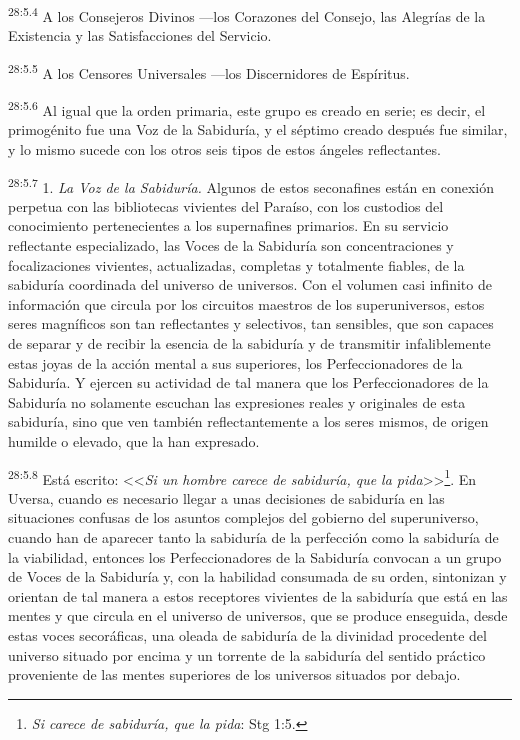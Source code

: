 \par
\textsuperscript{28:5.4} A los Consejeros Divinos ---los Corazones del Consejo, las Alegrías de la Existencia y las Satisfacciones del Servicio.

\par
\textsuperscript{28:5.5} A los Censores Universales ---los Discernidores de Espíritus.

\par
\textsuperscript{28:5.6} Al igual que la orden primaria, este grupo es creado en serie; es decir, el primogénito fue una Voz de la Sabiduría, y el séptimo creado después fue similar, y lo mismo sucede con los otros seis tipos de estos ángeles reflectantes.

\par
\textsuperscript{28:5.7} 1. \textit{La Voz de la Sabiduría.} Algunos de estos seconafines están en conexión perpetua con las bibliotecas vivientes del Paraíso, con los custodios del conocimiento pertenecientes a los supernafines primarios. En su servicio reflectante especializado, las Voces de la Sabiduría son concentraciones y focalizaciones vivientes, actualizadas, completas y totalmente fiables, de la sabiduría coordinada del universo de universos. Con el volumen casi infinito de información que circula por los circuitos maestros de los superuniversos, estos seres magníficos son tan reflectantes y selectivos, tan sensibles, que son capaces de separar y de recibir la esencia de la sabiduría y de transmitir infaliblemente estas joyas de la acción mental a sus superiores, los Perfeccionadores de la Sabiduría. Y ejercen su actividad de tal manera que los Perfeccionadores de la Sabiduría no solamente escuchan las expresiones reales y originales de esta sabiduría, sino que ven también reflectantemente a los seres mismos, de origen humilde o elevado, que la han expresado.

\par
\textsuperscript{28:5.8} Está escrito: <<\textit{Si un hombre carece de sabiduría, que la pida}>>\footnote{\textit{Si carece de sabiduría, que la pida}: Stg 1:5.}. En Uversa, cuando es necesario llegar a unas decisiones de sabiduría en las situaciones confusas de los asuntos complejos del gobierno del superuniverso, cuando han de aparecer tanto la sabiduría de la perfección como la sabiduría de la viabilidad, entonces los Perfeccionadores de la Sabiduría convocan a un grupo de Voces de la Sabiduría y, con la habilidad consumada de su orden, sintonizan y orientan de tal manera a estos receptores vivientes de la sabiduría que está en las mentes y que circula en el universo de universos, que se produce enseguida, desde estas voces secoráficas, una oleada de sabiduría de la divinidad procedente del universo situado por encima y un torrente de la sabiduría del sentido práctico proveniente de las mentes superiores de los universos situados por debajo.

